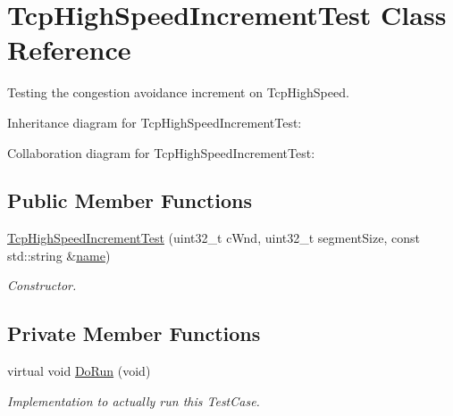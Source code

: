 \hypertarget{classTcpHighSpeedIncrementTest}{}\section{Tcp\+High\+Speed\+Increment\+Test Class Reference}
\label{classTcpHighSpeedIncrementTest}


Testing the congestion avoidance increment on Tcp\+High\+Speed.  




Inheritance diagram for Tcp\+High\+Speed\+Increment\+Test\+:


Collaboration diagram for Tcp\+High\+Speed\+Increment\+Test\+:
\subsection*{Public Member Functions}
\begin{DoxyCompactItemize}
\item 
\hyperlink{classTcpHighSpeedIncrementTest_aa7f3181c3c9de5e26bbf77e56252e9c3}{Tcp\+High\+Speed\+Increment\+Test} (uint32\+\_\+t c\+Wnd, uint32\+\_\+t segment\+Size, const std\+::string \&\hyperlink{generate__test__data__lte__spectrum__model_8m_ab74e6bf80237ddc4109968cedc58c151}{name})
\begin{DoxyCompactList}\small\item\em Constructor. \end{DoxyCompactList}\end{DoxyCompactItemize}
\subsection*{Private Member Functions}
\begin{DoxyCompactItemize}
\item 
virtual void \hyperlink{classTcpHighSpeedIncrementTest_ac39ab0eb61414b4821d81d259ddf9e88}{Do\+Run} (void)
\begin{DoxyCompactList}\small\item\em Implementation to actually run this Test\+Case. \end{DoxyCompactList}\end{DoxyCompactItemize}
